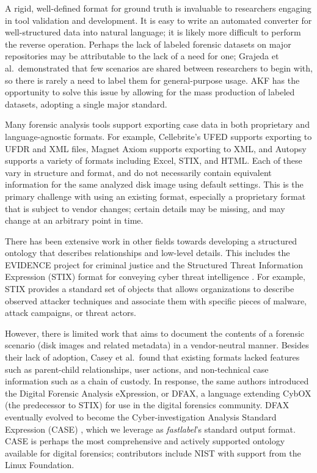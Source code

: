 \documentclass[letterpaper,12pt]{report}
\begin{document}
A rigid, well-defined format for ground truth is invaluable to
researchers engaging in tool validation and development. It is easy to
write an automated converter for well-structured data into natural
language; it is likely more difficult to perform the reverse operation.
Perhaps the lack of labeled forensic datasets on major repositories may
be attributable to the lack of a need for one; Grajeda et
al.~demonstrated that few scenarios are shared between researchers to
begin with, so there is rarely a need to label them for general-purpose
usage. AKF has the opportunity to solve this issue by allowing for the
mass production of labeled datasets, adopting a single major standard.

Many forensic analysis tools support exporting case data in both
proprietary and language-agnostic formats. For example, Cellebrite's
UFED supports exporting to UFDR and XML files, Magnet Axiom supports
exporting to XML, and Autopsy supports a variety of formats including
Excel, STIX, and HTML. Each of these vary in structure and format, and
do not necessarily contain equivalent information for the same analyzed
disk image using default settings. This is the primary challenge with
using an existing format, especially a proprietary format that is
subject to vendor changes; certain details may be missing, and may
change at an arbitrary point in time.

There has been extensive work in other fields towards developing a
structured ontology that describes relationships and low-level details.
This includes the EVIDENCE project for criminal justice and the
Structured Threat Information Expression (STIX) format for conveying
cyber threat intelligence
\cite{caseyLeveragingCybOXStandardize2015}. For example, STIX
provides a standard set of objects that allows organizations to describe
observed attacker techniques and associate them with specific pieces of
malware, attack campaigns, or threat actors.

However, there is limited work that aims to document the contents of a
forensic scenario (disk images and related metadata) in a vendor-neutral
manner. Besides their lack of adoption, Casey et al.~found that existing
formats lacked features such as parent-child relationships, user
actions, and non-technical case information such as a chain of custody.
In response, the same authors introduced the Digital Forensic Analysis
eXpression, or DFAX, a language extending CybOX (the predecessor to
STIX) for use in the digital forensics community. DFAX eventually
evolved to become the Cyber-investigation Analysis Standard Expression
(CASE) \cite{caseyAdvancingCoordinatedCyberinvestigations2017},
which we leverage as \emph{fastlabel}'s standard output format. CASE is
perhaps the most comprehensive and actively supported ontology available
for digital forensics; contributors include NIST with support from the
Linux Foundation.
\end{document}
